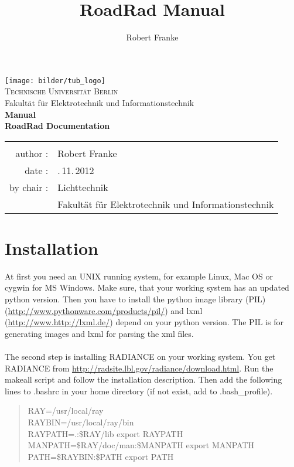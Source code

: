 \documentclass[10pt,a4paper]{report}
\author{Robert Franke}
\title{RoadRad Manual}
\begin{document}
\begin{titlepage}
\centering
\texttt{[image: bilder/tub\_logo]}\\[3ex]
{\Large \textsc{Technische Universität Berlin}}\\[3ex]
{\Large Fakultät für Elektrotechnik und Informationstechnik}\\[3ex]
\vfill
{\Large \textbf{Manual}}\\[4ex]
{\large \textbf{RoadRad Documentation}}\\[5ex]
\vfill
\begin{tabular}{rl}
\hline\\
author :          		& \quad Robert Franke \\[1,5ex]

date :         			& \quad 26.\,11.\,2012\\[1,5ex]

by chair :				& \quad Lichttechnik\\[1,5ex]
                        & \quad Fakultät für Elektrotechnik und Informationstechnik\\[1,5ex]

\end{tabular}
\vfill
\end{titlepage}

\newpage\thispagestyle{empty}
\tableofcontents %
\newpage
\setcounter{page}{1}

\chapter{Installation}
At first you need an UNIX running system, for example Linux, Mac OS or cygwin for MS Windows. Make sure, that your working system has an updated python version. Then you have to install the python image library (PIL) (\url{http://www.pythonware.com/products/pil/}) and lxml (\url{http://www.http://lxml.de/}) depend on your python version. The PIL is for generating images and lxml for parsing the xml files.\\
\\
The second step is installing RADIANCE on your working system. You get RADIANCE from \url{http://radsite.lbl.gov/radiance/download.html}. Run the makeall script and follow the installation
description. Then add the following lines to .bashrc in your home directory (if not exist, add to .bash\_profile).

\begin{quote}
RAY=/usr/local/ray\\
RAYBIN=/usr/local/ray/bin\\
RAYPATH=.:\$RAY/lib export RAYPATH\\
MANPATH=\$RAY/doc/man:\$MANPATH export MANPATH\\
PATH=\$RAYBIN:\$PATH export PATH
\end{quote}
\end{document}
